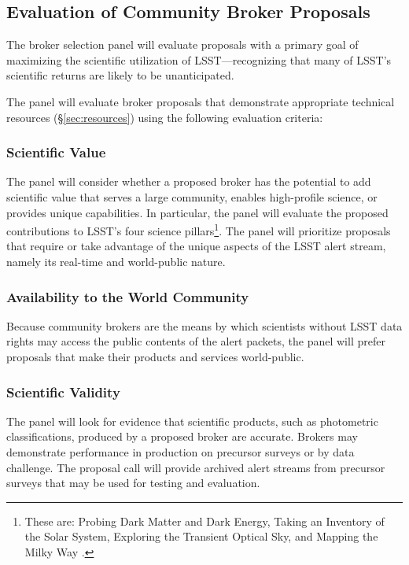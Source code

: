 \subsection{Evaluation of Community Broker Proposals} \label{sec:evaluation}

The broker selection panel will evaluate proposals with a primary goal of maximizing the scientific utilization of LSST---recognizing that many of LSST's scientific returns are likely to be unanticipated.

The panel will evaluate broker proposals that demonstrate appropriate technical resources (\S \ref{sec:resources}) using the following evaluation criteria:

\subsubsection{Scientific Value}

The panel will consider whether a proposed broker has the potential to add scientific value that serves a large community, enables high-profile science, or provides unique capabilities.
In particular, the panel will evaluate the proposed contributions to LSST's four science pillars\footnote{These are: Probing Dark Matter and Dark Energy, Taking an Inventory of the Solar System, Exploring the Transient Optical Sky, and Mapping the Milky Way .}.
The panel will prioritize proposals that require or take advantage of the unique aspects of the LSST alert stream, namely its real-time and world-public nature.

\subsubsection{Availability to the World Community}

Because community brokers are the means by which scientists without LSST data rights may access the public contents of the alert packets, the panel will prefer proposals that make their products and services world-public.

\subsubsection{Scientific Validity}

The panel will look for evidence that scientific products, such as photometric classifications, produced by a proposed broker are accurate.  
Brokers may demonstrate performance in production on precursor surveys or by data challenge.
The proposal call will provide archived alert streams from precursor surveys that may be used for testing and evaluation.

